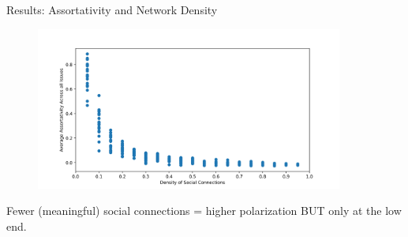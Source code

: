 \documentclass[12pt]{beamer}
\begin{document}
\begin{frame}[c]{Results: Assortativity and Network Density}  %


\begin{figure}
	\includegraphics[width=0.9\textwidth]{images/Assort_edge.png}

\end{figure}

\vspace{-.3in}
\small
Fewer (meaningful) social connections = higher polarization BUT only at the low end.

\end{frame}
\end{document}
